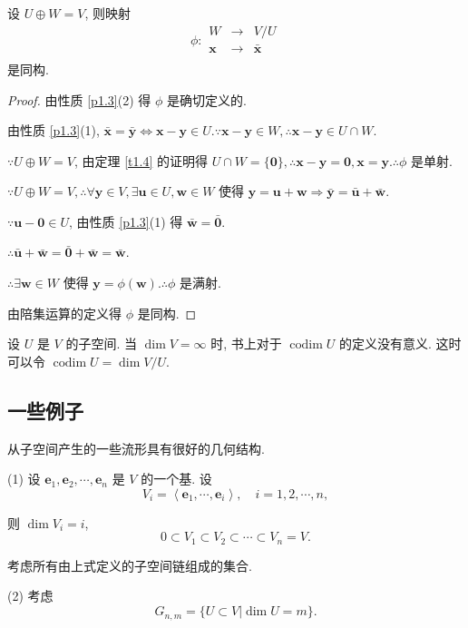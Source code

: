 \documentclass{ctexart}
\begin{document}
\begin{theorem}[书上的定理 10]
    设 $U\oplus W=V$, 则映射
    \[\phi:\begin{array}{rcl}
        W & \to & V/U \\
        \boldsymbol{x} & \to & \bar{\boldsymbol{x}} \\
    \end{array}\]
    是同构.
\end{theorem}
\begin{proof}
    由性质 \ref{p1.3}(2) 得 $\phi$ 是确切定义的.
    
    由性质 \ref{p1.3}(1), $\bar{\boldsymbol{x}}=\bar{\boldsymbol{y}}\Leftrightarrow\boldsymbol{x}-\boldsymbol{y}\in U.\because\boldsymbol{x}-\boldsymbol{y}\in W,\therefore\boldsymbol{x}-\boldsymbol{y}\in U\cap W$.

    $\because U\oplus W=V$, 由定理 \ref{t1.4} 的证明得 $U\cap W=\{\boldsymbol{0}\},\therefore\boldsymbol{x}-\boldsymbol{y}=\boldsymbol{0},\boldsymbol{x}=\boldsymbol{y}.\therefore\phi$ 是单射.

    $\because U\oplus W=V,\therefore\forall\boldsymbol{y}\in V,\exists\boldsymbol{u}\in U,\boldsymbol{w}\in W$ 使得 $\boldsymbol{y}=\boldsymbol{u}+\boldsymbol{w}\Rightarrow\bar{\boldsymbol{y}}=\bar{\boldsymbol{u}}+\bar{\boldsymbol{w}}$.

    $\because\boldsymbol{u}-\boldsymbol{0}\in U$, 由性质 \ref{p1.3}(1) 得 $\bar{\boldsymbol{w}}=\bar{\boldsymbol{0}}$.

    $\therefore\bar{\boldsymbol{u}}+\bar{\boldsymbol{w}}=\bar{\boldsymbol{0}}+\bar{\boldsymbol{w}}=\bar{\boldsymbol{w}}$.
    
    $\therefore\exists\boldsymbol{w}\in W$ 使得 $\boldsymbol{y}=\phi(\boldsymbol{w}).\therefore\phi$ 是满射.
    
    由陪集运算的定义得 $\phi$ 是同构.
\end{proof}
设 $U$ 是 $V$ 的子空间. 当 $\dim V=\infty$ 时, 书上对于 $\operatorname{codim}U$ 的定义没有意义. 这时可以令 $\operatorname{codim}U=\dim V/U$.
\subsection{一些例子}
\begin{example}
    从子空间产生的一些流形具有很好的几何结构.

    (1) 设 $\boldsymbol{e}_1,\boldsymbol{e}_2,\cdots,\boldsymbol{e}_n$ 是 $V$ 的一个基. 设
    \[V_i=\left<\boldsymbol{e}_1,\cdots,\boldsymbol{e}_i\right>,\quad i=1,2,\cdots,n,\]

    则 $\dim V_i=i$,
    \[0\subset V_1\subset V_2\subset\cdots\subset V_n=V.\]
    
    考虑所有由上式定义的子空间链组成的集合.

    (2) 考虑
    \[G_{n,m}=\{U\subset V|\dim U=m\}.\]
\end{example}
\end{document}
